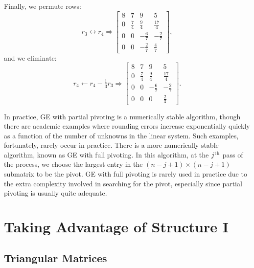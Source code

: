 \begin{example}
\[\]
Finally, we permute rows:
\[
r_3\leftrightarrow r_4 \Rightarrow  \begin{bmatrix} 8 & 7 & 9 & 5\\ 0 & \frac{7}{4} & \frac{9}{4} & \frac{17}{4}\\ 0 & 0 & -\frac{6}{7} & -\frac{2}{7}\\ 0 & 0 & -\frac{2}{7} & \frac{4}{7}\end{bmatrix},
\]
and we eliminate:
\[
r_4\leftarrow r_4 - \tfrac{1}{3}r_3 \Rightarrow  \begin{bmatrix} 8 & 7 & 9 & 5\\ 0 & \frac{7}{4} & \frac{9}{4} & \frac{17}{4}\\ 0 & 0 & -\frac{6}{7} & -\frac{2}{7}\\ 0 & 0 & 0 & \frac{2}{3}\end{bmatrix}.
\]
\end{example}

In practice, GE with partial pivoting is a numerically stable algorithm, though there are academic examples where rounding errors increase exponentially quickly as a function of the number of unknowns in the linear system. Such examples, fortunately, rarely occur in practice. There is a more numerically stable algorithm, known as GE with full pivoting. In this algorithm, at the $j^{\rm th}$ pass of the process, we choose the largest entry in the $(n-j+1)\times(n-j+1)$ submatrix to be the pivot. GE with full pivoting is rarely used in practice due to the extra complexity involved in searching for the pivot, especially since partial pivoting is usually quite adequate.

\section{Taking Advantage of Structure I}

\subsection{Triangular Matrices}

